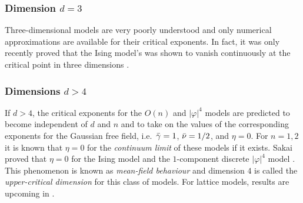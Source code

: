 
\subsubsection{Dimension $d=3$}

Three-dimensional models are very poorly understood and only numerical approximations
are available for their critical exponents. In fact, it was only recently proved
that the Ising model's  was shown to vanish continuously at
the critical point in three dimensions \cite{ADS15}.

\subsubsection{Dimensions $d > 4$}

If $d > 4$, the critical exponents for the $O(n)$ and $|\varphi|^4$ models are
predicted to become independent of $d$ and $n$ and to take on the values of the
corresponding exponents for the Gaussian free field, i.e.\ $\bar\gamma = 1$,
$\bar\nu = 1/2$, and $\eta = 0$. For $n = 1, 2$ it is known that $\eta = 0$
for the \emph{continuum limit} of these models \cite{Aiz82,Fro82} if it exists.
Sakai proved that $\eta = 0$ for the Ising model \cite{Sakai07} and the $1$-component
discrete $|\varphi|^4$ model \cite{Sakai15}.
This phenomenon is known as \emph{mean-field behaviour} and dimension $4$ is
called the \emph{upper-critical dimension} for this class of models.
For lattice models, results are upcoming in \cite{BHH17}.

